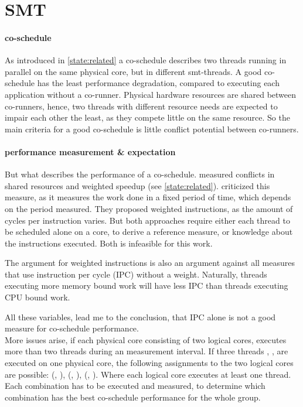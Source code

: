 \section{SMT}
\label{design:smt}

\paragraph{co-schedule}
As introduced in \ref{state:related} a co-schedule describes two threads running
in parallel on the same physical core, but in different \gls{smt}-threads.
A good co-schedule has the least performance degradation,
compared to executing each application without a co-runner.
Physical hardware resources are shared between co-runners, hence, two threads with
different resource needs are expected to impair each other the least, as they
compete little on the same resource.
So the main criteria for a good co-schedule is little conflict potential
between co-runners.

\paragraph{performance measurement \& expectation}
But what describes the performance of a co-schedule.
\citeauthor{snavely_symbiotic_2000} measured conflicts in shared
resources and weighted speedup (see \ref{state:related}).
\citeauthor{eyerman_revisiting_2015} criticized this measure, as it measures
the work done in a fixed period of time, which depends on the period measured.
They proposed weighted instructions, as the amount of cycles per instruction
varies.
But both approaches require either each thread to be scheduled alone on a core,
to derive a reference measure, or knowledge about the instructions executed.
Both is infeasible for this work.

The argument for weighted instructions is also an argument against all measures
that use instruction per cycle (IPC) without a weight.
Naturally, threads executing more memory bound work will have less IPC than
threads executing CPU bound work.

All these variables, lead me to the conclusion, that IPC alone is not a good
measure for co-schedule performance.
\\

More issues arise, if each physical core consisting of two logical cores,
executes more than two threads during an measurement interval.
If three threads \alpha{}, \beta{}, \gamma{} are executed on one physical core,
the following assignments to the two logical cores are possible:
(\alpha{}, \beta{}\gamma{}), (\beta{}, \alpha{}\gamma{}), (\gamma{}, \alpha\beta).
Where each logical core executes at least one thread.
Each combination has to be executed and measured, to determine which
combination has the best co-schedule performance for the whole group.

